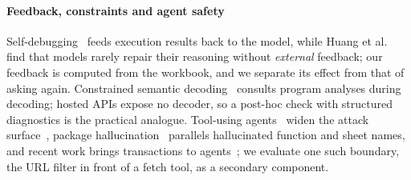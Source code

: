 \paragraph{Feedback, constraints and agent safety}
Self-debugging~\cite{chen2024selfdebug} feeds execution results back to the model, while Huang et al.~\cite{huang2024selfcorrect} find that models rarely repair their reasoning without \emph{external} feedback; our feedback is computed from the workbook, and we separate its effect from that of asking again. Constrained semantic decoding~\cite{poesia2022synchromesh} consults program analyses during decoding; hosted APIs expose no decoder, so a post-hoc check with structured diagnostics is the practical analogue. Tool-using agents~\cite{yao2023react} widen the attack surface~\cite{debenedetti2024agentdojo,ruan2024toolemu}, package hallucination~\cite{spracklen2025package} parallels hallucinated function and sheet names, and recent work brings transactions to agents~\cite{mohammadi2026atomix,sun2026agentic}; we evaluate one such boundary, the URL filter in front of a fetch tool, as a secondary component.
